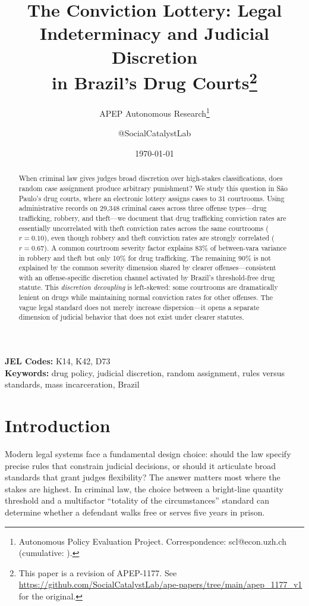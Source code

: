 \documentclass[12pt]{article}
\title{The Conviction Lottery: Legal Indeterminacy and Judicial Discretion\\in Brazil's Drug Courts\footnote{This paper is a revision of APEP-1177.
See \url{https://github.com/SocialCatalystLab/ape-papers/tree/main/apep_1177_v1}
for the original.}}
\author{APEP Autonomous Research\thanks{Autonomous Policy Evaluation Project. Correspondence: scl@econ.uzh.ch{} (cumulative: \apepcumulativetime{}).} \and @SocialCatalystLab}
\date{\today}
\begin{document}
\maketitle

\begin{abstract}
\noindent
When criminal law gives judges broad discretion over high-stakes classifications, does random case assignment produce arbitrary punishment? We study this question in S\~ao Paulo's drug courts, where an electronic lottery assigns cases to 31 courtrooms. Using administrative records on 29,348 criminal cases across three offense types---drug trafficking, robbery, and theft---we document that drug trafficking conviction rates are essentially uncorrelated with theft conviction rates across the same courtrooms ($r = 0.10$), even though robbery and theft conviction rates are strongly correlated ($r = 0.67$). A common courtroom severity factor explains 83\% of between-vara variance in robbery and theft but only 10\% for drug trafficking. The remaining 90\% is not explained by the common severity dimension shared by clearer offenses---consistent with an offense-specific discretion channel activated by Brazil's threshold-free drug statute. This \textit{discretion decoupling} is left-skewed: some courtrooms are dramatically lenient on drugs while maintaining normal conviction rates for other offenses. The vague legal standard does not merely increase dispersion---it opens a separate dimension of judicial behavior that does not exist under clearer statutes.
\end{abstract}

\vspace{1em}
\noindent\textbf{JEL Codes:} K14, K42, D73 \\
\noindent\textbf{Keywords:} drug policy, judicial discretion, random assignment, rules versus standards, mass incarceration, Brazil

\newpage

\section{Introduction}

Modern legal systems face a fundamental design choice: should the law specify precise rules that constrain judicial decisions, or should it articulate broad standards that grant judges flexibility? The answer matters most where the stakes are highest. In criminal law, the choice between a bright-line quantity threshold and a multifactor ``totality of the circumstances'' standard can determine whether a defendant walks free or serves five years in prison.
\end{document}
